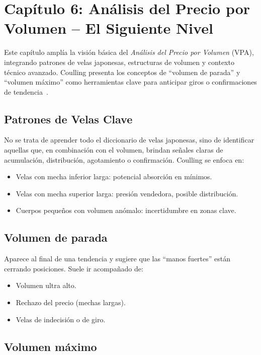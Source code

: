 \section{Cap\'itulo 6: An\'alisis del Precio por Volumen -- El Siguiente Nivel}

Este cap\'itulo ampl\'ia la visi\'on b\'asica del \textit{An\'alisis del Precio por Volumen} (VPA), integrando patrones de velas japonesas, estructuras de volumen y contexto t\'ecnico avanzado. Coulling presenta los conceptos de ``volumen de parada'' y ``volumen m\'aximo'' como herramientas clave para anticipar giros o confirmaciones de tendencia~\cite{Coulling13}.

\subsection{Patrones de Velas Clave}

No se trata de aprender todo el diccionario de velas japonesas, sino de identificar aquellas que, en combinaci\'on con el volumen, brindan se\~nales claras de acumulaci\'on, distribuci\'on, agotamiento o confirmaci\'on. Coulling se enfoca en:
\begin{itemize}
  \item Velas con mecha inferior larga: potencial absorci\'on en m\'inimos.
  \item Velas con mecha superior larga: presi\'on vendedora, posible distribuci\'on.
  \item Cuerpos peque\~nos con volumen an\'omalo: incertidumbre en zonas clave.
\end{itemize}

\subsection{Volumen de parada}

Aparece al final de una tendencia y sugiere que las ``manos fuertes'' est\'an cerrando posiciones. Suele ir acompa\~nado de:
\begin{itemize}
  \item Volumen ultra alto.
  \item Rechazo del precio (mechas largas).
  \item Velas de indecisi\'on o de giro.
\end{itemize}

\subsection{Volumen m\'aximo}

